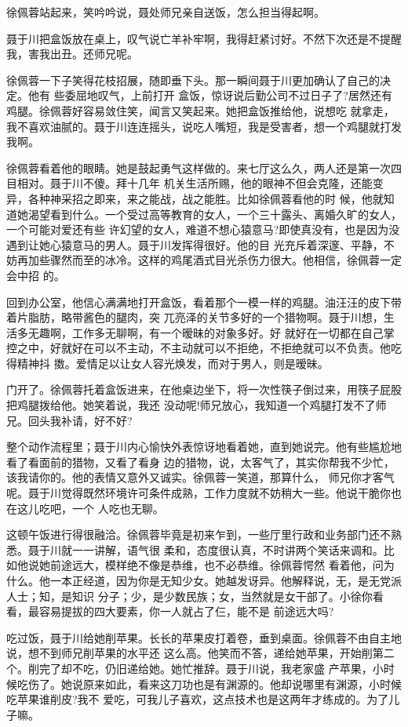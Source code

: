 \documentclass[11pt,a4paper,onecolumn]{article}
\begin{document}
徐佩蓉站起来，笑吟吟说，聂处师兄亲自送饭，怎么担当得起啊。

聂于川把盒饭放在桌上，叹气说亡羊补牢啊，我得赶紧讨好。不然下次还是不提醒我，害我出丑。还师兄呢。

徐佩蓉一下子笑得花枝招展，随即垂下头。那一瞬间聂于川更加确认了自己的决定。他有 些委屈地叹气，上前打开
盒饭，惊讶说后勤公司不过日子了?居然还有鸡腿。徐佩蓉好容易敛住笑，闻言又笑起来。她把盒饭推给他，说想吃
就拿走，我不喜欢油腻的。聂于川连连摇头，说吃人嘴短，我是受害者，想一个鸡腿就打发我啊。

徐佩蓉看着他的眼睛。她是鼓起勇气这样做的。来七厅这么久，两人还是第一次四目相对。聂于川不傻。拜十几年
机关生活所赐，他的眼神不但会克隆，还能变异，各种神采招之即来，来之能战，战之能胜。比如徐佩蓉看他的时
候，他就知道她渴望看到什么。一个受过高等教育的女人，一个三十露头、离婚久旷的女人，一个可能对爱还有些
许幻望的女人，难道不想心猿意马?即使真没有，也是因为没遇到让她心猿意马的男人。聂于川发挥得很好。他的目
光充斥着深邃、平静，不妨再加些骤然而至的冰冷。这样的鸡尾酒式目光杀伤力很大。他相信，徐佩蓉一定会中招
的。

回到办公室，他信心满满地打开盒饭，看着那个一模一样的鸡腿。油汪汪的皮下带着片脂肪，略带酱色的腿肉，突
兀亮泽的关节\myrule{}多好的一个猎物啊。聂于川想，生活多无趣啊，工作多无聊啊，有一个暧昧的对象多好。好
就好在一切都在自己掌控之中，好就好在可以不主动，不主动就可以不拒绝，不拒绝就可以不负责。他吃得精神抖
擞。爱情足以让女人容光焕发，而对于男人，则是暧昧。

门开了。徐佩蓉托着盒饭进来，在他桌边坐下，将一次性筷子倒过来，用筷子屁股把鸡腿拨给他。她笑着说，我还
没动呢!师兄放心，我知道一个鸡腿打发不了师兄。回头我补请，好不好?

整个动作流程里；聂于川内心愉快外表惊讶地看着她，直到她说完。他有些尴尬地看了看面前的猎物，又看了看身
边的猎物，说，太客气了，其实你帮我不少忙，该我请你的。他的表情又意外又诚实。徐佩蓉一笑道，那算什么，
师兄你才客气呢。聂于川觉得既然环境许可条件成熟，工作力度就不妨稍大一些。他说干脆你也在这儿吃吧，一个
人吃也无聊。

这顿午饭进行得很融洽。徐佩蓉毕竟是初来乍到，一些厅里行政和业务部门还不熟悉。聂于川就一一讲解，语气很
柔和，态度很认真，不时讲两个笑话来调和。比如他说她前途远大，模样绝不像是恭维，也不必恭维。徐佩蓉愕然
看着他，问为什么。他一本正经道，因为你是无知少女。她越发讶异。他解释说，无，是无党派人士；知，是知识
分子；少，是少数民族；女，当然就是女干部了。小徐你看看，最容易提拔的四大要素，你一人就占了仨，能不是
前途远大吗?

吃过饭，聂于川给她削苹果。长长的苹果皮打着卷，垂到桌面。徐佩蓉不由自主地说，想不到师兄削苹果的水平还
这么高。他笑而不答，递给她苹果，开始削第二个。削完了却不吃，仍旧递给她。她忙推辞。聂于川说，我老家盛
产苹果，小时候吃伤了。她说原来如此，看来这刀功也是有渊源的。他却说哪里有渊源，小时候吃苹果谁削皮?我不
爱吃，可我儿子喜欢，这点技术也是这两年才练成的。为了儿子嘛。
\end{document}
